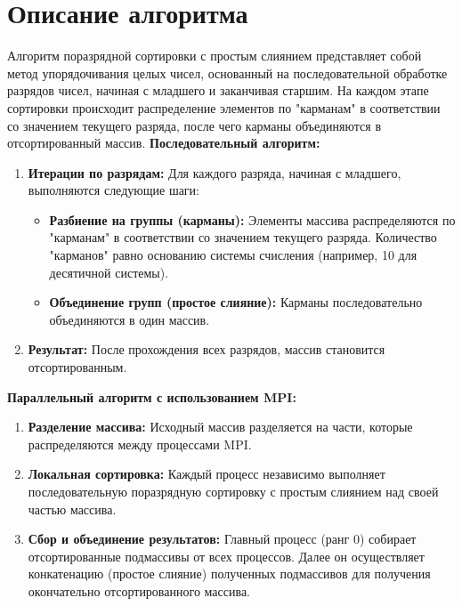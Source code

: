 \documentclass[a4paper, 14pt]{article}
\begin{document}
	
	
	
	\newpage

\section*{\centering Описание алгоритма}

\indent Алгоритм поразрядной сортировки с простым слиянием представляет собой метод упорядочивания целых чисел, основанный на последовательной обработке разрядов чисел, начиная с младшего и заканчивая старшим. На каждом этапе сортировки происходит распределение элементов по "карманам" в соответствии со значением текущего разряда, после чего карманы объединяются в отсортированный массив.
\textbf{Последовательный алгоритм:}
\vspace{-1em}
\begin{enumerate}
    \item \textbf{Итерации по разрядам:} Для каждого разряда, начиная с младшего, выполняются следующие шаги:
    \begin{itemize}
         \item \textbf{Разбиение на группы (карманы):} Элементы массива распределяются по "карманам" в соответствии со значением текущего разряда. Количество "карманов" равно основанию системы счисления (например, 10 для десятичной системы).
        \item \textbf{Объединение групп (простое слияние):}  Карманы последовательно объединяются в один массив.
    \end{itemize}
     \item \textbf{Результат:} После прохождения всех разрядов, массив становится отсортированным.
\end{enumerate}

\textbf{Параллельный алгоритм с использованием MPI:}
\vspace{-1em}
\begin{enumerate}
    \item \textbf{Разделение массива:} Исходный массив разделяется на части, которые распределяются между процессами MPI.
    \item \textbf{Локальная сортировка:} Каждый процесс независимо выполняет последовательную поразрядную сортировку с простым слиянием над своей частью массива.
     \item \textbf{Сбор и объединение результатов:} Главный процесс (ранг 0) собирает отсортированные подмассивы от всех процессов. Далее он осуществляет конкатенацию (простое слияние) полученных подмассивов для получения окончательно отсортированного массива.
\end{enumerate}
\end{document}
